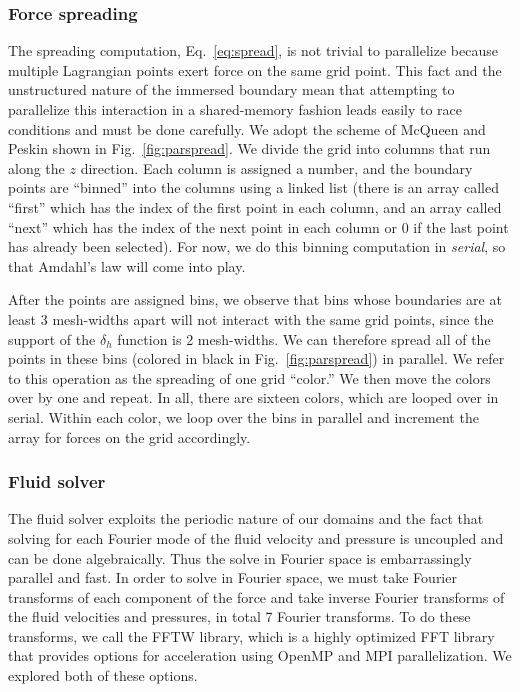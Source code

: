 \documentclass[]{article}
\begin{document}
\subsubsection{Force spreading}
The spreading computation, Eq.\ \eqref{eq:spread}, is not trivial to parallelize because multiple Lagrangian points exert force on the same grid point. This fact and the unstructured nature of the immersed boundary mean that attempting to parallelize this interaction in a shared-memory fashion leads easily to race conditions and must be done carefully. We adopt the scheme of McQueen and Peskin \cite{mcqueen} shown in Fig.\ \ref{fig:parspread}. We divide the grid into columns that run along the $z$ direction. Each column is assigned a number, and the boundary points are ``binned'' into the columns using a linked list (there is an array called ``first'' which has the index of the first point in each column, and an array called ``next'' which has the index of the next point in each column or 0 if the last point has already been selected). For now, we do this binning computation in \textit{serial}, so that Amdahl's law will come into play. 

After the points are assigned bins, we observe that bins whose boundaries are at least 3 mesh-widths apart will not interact with the same grid points, since the support of the $\delta_h$ function is 2 mesh-widths. We can therefore spread all of the points in these bins (colored in black in Fig.\ \ref{fig:parspread}) in parallel. We refer to this operation as the spreading of one grid ``color.'' We then move the colors over by one and repeat. In all, there are sixteen colors, which are looped over in serial. Within each color, we loop over the bins in parallel and increment the array for forces on the grid accordingly. 

\subsubsection{Fluid solver}
The fluid solver exploits the periodic nature of our domains and the fact that solving for each Fourier mode of the fluid velocity and pressure is uncoupled and can be done algebraically. Thus the solve in Fourier space is embarrassingly parallel and fast. In order to solve in Fourier space, we must take Fourier transforms of each component of the force and take inverse Fourier transforms of the fluid velocities and pressures, in total 7 Fourier transforms. To do these transforms, we call the FFTW library, which is a highly optimized FFT library that provides options for acceleration using OpenMP and MPI parallelization. We explored both of these options.
\end{document}
